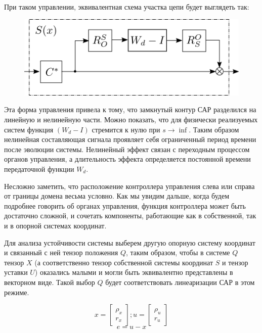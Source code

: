 \documentclass[a4paper]{article}
\begin{document}
При таком управлении, эквивалентная схема участка цепи будет выглядеть так:
{
\begin{figure}[H]
\centering
\includegraphics{./src/sheme3.png}
\end{figure}
}

Эта форма управления привела к тому, что замкнутый контур САР разделился на линейную и нелинейную части.
Можно показать, что для физически реализуемых систем функция $(W_d - I)$ стремится к нулю при $s \rightarrow \inf$. Таким образом нелинейная составляющая сигнала проявляет себя ограниченный период времени после эволюции системы. Нелинейный эффект связан с переходным процессом органов управления, а длительность эффекта определяется постоянной времени передаточной функции $W_d$.

Несложно заметить, что расположение контроллера управления слева или справа от границы домена весьма условно. Как мы увидим дальше, когда будем подробнее говорить об органах управления, функция контроллера может быть достаточно сложной, и сочетать компоненты, работающие как в собственной, так и в опорной системах координат.

Для анализа устойчивости системы выберем другую опорную систему координат и связанный с ней тензор положения $Q$, таким образом, чтобы в системе $Q$ тензор $X$ (а соответственно тензор собственной системы координат $S$ и тензор уставки $U$) оказались малыми и могли быть эквивалентно представлены в векторном виде. Такой выбор $Q$ будет соответствовать линеаризации САР в этом режиме.

\begin{equation}
x = \begin{bmatrix}\rho_x\\r_x\end{bmatrix};  
u = \begin{bmatrix}\rho_u\\r_u\end{bmatrix}
\end{equation}
\begin{equation}
e = u - x
\end{equation}
\end{document}

